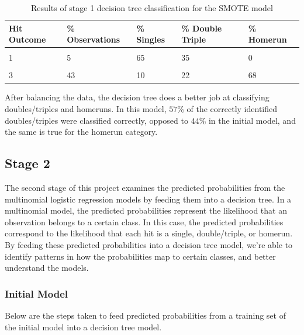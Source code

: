 \documentclass[
  letterpaper,
  DIV=11,
  numbers=noendperiod]{scrartcl}
\begin{document}
\begin{table}[!h]
\centering
\caption{\label{tab:unnamed-chunk-49}Results of stage 1 decision tree classification for the SMOTE model}
\centering
\begin{tabular}[t]{lllll}
\toprule
Hit Outcome & \% Observations & \% Singles & \% Double Triple & \% Homerun\\
\midrule
\cellcolor{gray!10}{1} & \cellcolor{gray!10}{32} & \cellcolor{gray!10}{74} & \cellcolor{gray!10}{26} & \cellcolor{gray!10}{0}\\
1 & 5 & 65 & 35 & 0\\
\cellcolor{gray!10}{2} & \cellcolor{gray!10}{20} & \cellcolor{gray!10}{34} & \cellcolor{gray!10}{57} & \cellcolor{gray!10}{9}\\
3 & 43 & 10 & 22 & 68\\
\bottomrule
\end{tabular}
\end{table}

After balancing the data, the decision tree does a better job at
classifying doubles/triples and homeruns. In this model, \(57\)\% of the
correctly identified doubles/triples were classified correctly, opposed
to \(44\)\% in the initial model, and the same is true for the homerun
category.

\subsection{Stage 2}\label{stage-2}

The second stage of this project examines the predicted probabilities
from the multinomial logistic regression models by feeding them into a
decision tree. In a multinomial model, the predicted probabilities
represent the likelihood that an observation belongs to a certain class.
In this case, the predicted probabilities correspond to the likelihood
that each hit is a single, double/triple, or homerun. By feeding these
predicted probabilities into a decision tree model, we're able to
identify patterns in how the probabilities map to certain classes, and
better understand the models.

\subsubsection{Initial Model}\label{initial-model-1}

Below are the steps taken to feed predicted probabilities from a
training set of the initial model into a decision tree model.
\end{document}
